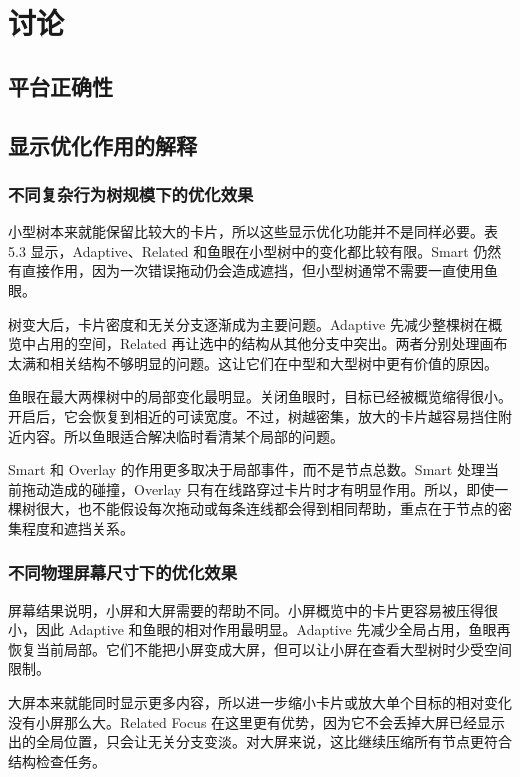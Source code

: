 \documentclass[11pt,a4paper,oneside,extrafontsizes]{memoir}
\begin{document}
\chapter{讨论}

\section{平台正确性}

\section{显示优化作用的解释}

\subsection{不同复杂行为树规模下的优化效果}

小型树本来就能保留比较大的卡片，所以这些显示优化功能并不是同样必要。表 5.3 显示，Adaptive、Related 和鱼眼在小型树中的变化都比较有限。Smart 仍然有直接作用，因为一次错误拖动仍会造成遮挡，但小型树通常不需要一直使用鱼眼。

树变大后，卡片密度和无关分支逐渐成为主要问题。Adaptive 先减少整棵树在概览中占用的空间，Related 再让选中的结构从其他分支中突出。两者分别处理画布太满和相关结构不够明显的问题。这让它们在中型和大型树中更有价值的原因。

鱼眼在最大两棵树中的局部变化最明显。关闭鱼眼时，目标已经被概览缩得很小。开启后，它会恢复到相近的可读宽度。不过，树越密集，放大的卡片越容易挡住附近内容。所以鱼眼适合解决临时看清某个局部的问题。

Smart 和 Overlay 的作用更多取决于局部事件，而不是节点总数。Smart 处理当前拖动造成的碰撞，Overlay 只有在线路穿过卡片时才有明显作用。所以，即使一棵树很大，也不能假设每次拖动或每条连线都会得到相同帮助，重点在于节点的密集程度和遮挡关系。

\subsection{不同物理屏幕尺寸下的优化效果}

屏幕结果说明，小屏和大屏需要的帮助不同。小屏概览中的卡片更容易被压得很小，因此 Adaptive 和鱼眼的相对作用最明显。Adaptive 先减少全局占用，鱼眼再恢复当前局部。它们不能把小屏变成大屏，但可以让小屏在查看大型树时少受空间限制。

大屏本来就能同时显示更多内容，所以进一步缩小卡片或放大单个目标的相对变化没有小屏那么大。Related Focus 在这里更有优势，因为它不会丢掉大屏已经显示出的全局位置，只会让无关分支变淡。对大屏来说，这比继续压缩所有节点更符合结构检查任务。
\end{document}
